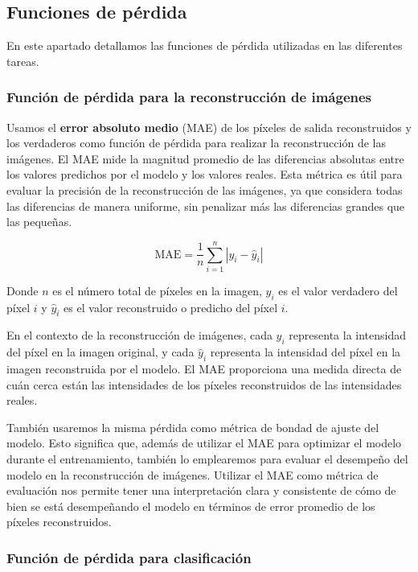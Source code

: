 \subsection{Funciones de pérdida}

En este apartado detallamos las funciones de pérdida utilizadas en las diferentes tareas.

\subsubsection{Función de pérdida para la reconstrucción de imágenes}

Usamos el \textbf{error absoluto medio} (MAE) de los píxeles de salida reconstruidos y los verdaderos como función de pérdida para realizar la reconstrucción de las imágenes. El MAE mide la magnitud promedio de las diferencias absolutas entre los valores predichos por el modelo y los valores reales. Esta métrica es útil para evaluar la precisión de la reconstrucción de las imágenes, ya que considera todas las diferencias de manera uniforme, sin penalizar más las diferencias grandes que las pequeñas.

$$ \text{MAE} = \frac{1}{n} \sum_{i=1}^{n} \left| y_i - \hat{y}_i \right| $$ 

Donde $n$ es el número total de píxeles en la imagen, $y_i$ es el valor verdadero del píxel $i$ y $\hat{y}_i$ es el valor reconstruido o predicho del píxel $i$.

En el contexto de la reconstrucción de imágenes, cada $y_i$ representa la intensidad del píxel en la imagen original, y cada $\hat{y}_i$ representa la intensidad del píxel en la imagen reconstruida por el modelo. El MAE proporciona una medida directa de cuán cerca están las intensidades de los píxeles reconstruidos de las intensidades reales.

También usaremos la misma pérdida como métrica de bondad de ajuste del modelo. Esto significa que, además de utilizar el MAE para optimizar el modelo durante el entrenamiento, también lo emplearemos para evaluar el desempeño del modelo en la reconstrucción de imágenes. Utilizar el MAE como métrica de evaluación nos permite tener una interpretación clara y consistente de cómo de bien se está desempeñando el modelo en términos de error promedio de los píxeles reconstruidos.

\subsubsection{Función de pérdida para clasificación}


